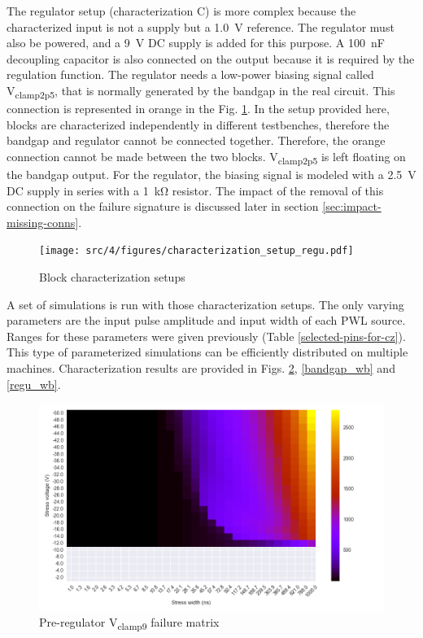 %
The regulator setup (characterization C) is more complex because the characterized input is not a supply but a \SI{1.0}{\volt} reference.
The regulator must also be powered, and a \SI{9}{\volt} DC supply is added for this purpose.
A \SI{100}{\nano\farad} decoupling capacitor is also connected on the output because it is required by the regulation function.
The regulator needs a low-power biasing signal called V\textsubscript{clamp2p5}, that is normally generated by the bandgap in the real circuit.
This connection is represented in orange in the Fig. \ref{fig:block_function_cz_regu}.
In the setup provided here, blocks are characterized independently in different testbenches, therefore the bandgap and regulator cannot be connected together.
Therefore, the orange connection cannot be made between the two blocks.
V\textsubscript{clamp2p5} is left floating on the bandgap output.
For the regulator, the biasing signal is modeled with a \SI{2.5}{\volt} DC supply in series with a \SI{1}{\kilo\ohm} resistor.
The impact of the removal of this connection on the failure signature is discussed later in section \ref{sec:impact-missing-conns}.

\begin{figure}[!h]
  \centering
  \texttt{[image: src/4/figures/characterization\_setup\_regu.pdf]}
  \caption{Block characterization setups}
  \label{fig:block_function_cz_regu}
\end{figure}

A set of simulations is run with those characterization setups.
The only varying parameters are the input pulse amplitude and input width of each PWL source.
Ranges for these parameters were given previously (Table \ref{selected-pins-for-cz}).
This type of parameterized simulations can be efficiently distributed on multiple machines.
Characterization results are provided in Figs. \ref{pre_regu_wb}, \ref{bandgap_wb} and \ref{regu_wb}.

\begin{figure}[!h]
  \centering
  \includegraphics[width=\textwidth]{src/4/figures/preregulator_cz.png}
  \caption{Pre-regulator V\textsubscript{clamp9} failure matrix}
  \label{pre_regu_wb}
\end{figure}

